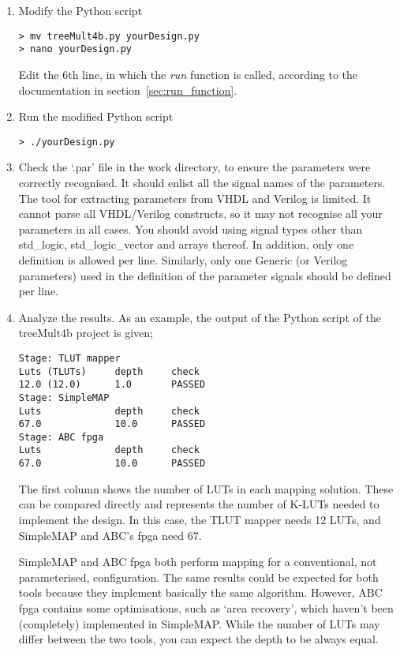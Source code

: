 \documentclass[a4paper,oneside]{memoir}
\begin{document}
\begin{enumerate}
\item Modify the Python script\\
\begin{lstlisting}
> mv treeMult4b.py yourDesign.py
> nano yourDesign.py
\end{lstlisting}
Edit the 6th line, in which the \emph{run} function is called, according to the documentation in section~\ref{sec:run_function}.
\item Run the modified Python script
\begin{lstlisting}
> ./yourDesign.py
\end{lstlisting}
\item \label{sec:check_par}Check the `.par' file in the work directory, to ensure the parameters were correctly recognised. It should enlist all the signal names of the parameters. \\
The tool for extracting parameters from VHDL and Verilog is limited. It cannot parse all VHDL/Verilog constructs, so it may not recognise all your parameters in all cases. You should avoid using signal types other than std\_logic, std\_logic\_vector and arrays thereof. In addition, only one definition is allowed per line. Similarly, only one Generic (or Verilog parameters) used in the definition of the parameter signals should be defined per line.

\item Analyze the results. As an example, the output of the Python script of the treeMult4b project is given;\\

\begin{lstlisting}
Stage: TLUT mapper
Luts (TLUTs)     depth     check
12.0 (12.0)      1.0       PASSED    
Stage: SimpleMAP
Luts             depth     check     
67.0             10.0      PASSED    
Stage: ABC fpga
Luts             depth     check     
67.0             10.0      PASSED 
\end{lstlisting}

The first column shows the number of LUTs in each mapping solution. These can be compared directly and represents the number of K-LUTs needed to implement the design. In this case, the TLUT mapper needs 12 LUTs, and SimpleMAP and ABC's fpga need 67.

SimpleMAP and ABC fpga both perform mapping for a conventional, not parameterised, configuration. The same results could be expected for both tools because they implement basically the same algorithm. However, ABC fpga contains some optimisations, such as `area recovery', which haven't been (completely) implemented in SimpleMAP. While the number of LUTs may differ between the two tools, you can expect the depth to be always equal.


\end{enumerate}
\end{document}
